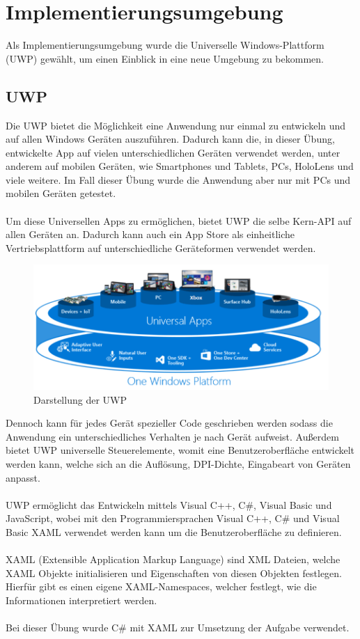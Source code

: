 
\section{Implementierungsumgebung}

Als Implementierungsumgebung wurde die Universelle Windows-Plattform (UWP) gewählt, um einen Einblick in eine neue Umgebung zu bekommen.

\subsection{UWP}

Die UWP bietet die Möglichkeit eine Anwendung nur einmal zu entwickeln und auf allen Windows Geräten auszuführen. Dadurch kann die, in dieser Übung, entwickelte App auf vielen unterschiedlichen Geräten verwendet werden, unter anderem auf mobilen Geräten, wie Smartphones und Tablets, PCs, HoloLens und viele weitere. Im Fall dieser Übung wurde die Anwendung aber nur mit PCs und mobilen Geräten getestet.
\\\\
Um diese Universellen Apps zu ermöglichen, bietet UWP die selbe Kern-API auf allen Geräten an. Dadurch kann auch ein App Store als einheitliche Vertriebsplattform auf unterschiedliche Geräteformen verwendet werden.

\begin{figure}[H]
	\centering
	\includegraphics[width=0.7\linewidth]{images/screenshot001}
	\caption{Darstellung der UWP}
	\label{fig:screenshot001}
\end{figure}

Dennoch kann für jedes Gerät spezieller Code geschrieben werden sodass die Anwendung ein unterschiedliches Verhalten je nach Gerät aufweist. Außerdem bietet UWP universelle Steuerelemente, womit eine Benutzeroberfläche entwickelt werden kann, welche sich an die Auflösung, DPI-Dichte, Eingabeart von Geräten anpasst.
\\\\
UWP ermöglicht das Entwickeln mittels Visual C++, C\#, Visual Basic und JavaScript, wobei mit den Programmiersprachen Visual C++, C\# und Visual Basic XAML verwendet werden kann um die Benutzeroberfläche zu definieren. \cite{UWPAllgemein}
\\\\
XAML (Extensible Application Markup Language) sind XML Dateien, welche XAML Objekte initialisieren und Eigenschaften von diesen Objekten festlegen. Hierfür gibt es einen eigene XAML-Namespaces, welcher festlegt, wie die Informationen interpretiert werden. \cite{xamlOverview}
\\\\
Bei dieser Übung wurde C\# mit XAML zur Umsetzung der Aufgabe verwendet.

